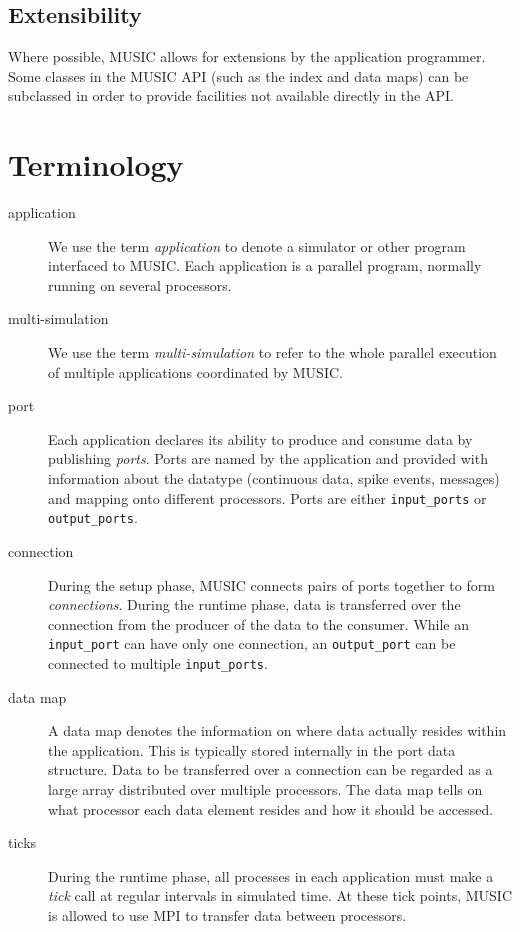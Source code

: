 \documentclass[a4paper,twoside]{report}
\begin{document}
\subsection{Extensibility}

Where possible, MUSIC allows for extensions by the application
programmer.  Some classes in the MUSIC API (such as the index and data
maps) can be subclassed in order to provide facilities not available
directly in the API.


\section{Terminology}

\begin{description}
\item[application] We use the term
  \emph{application} to denote a simulator or other
  program interfaced to MUSIC.  Each application is a parallel
  program, normally running on several processors.

\item[multi-simulation] We use the term
  \emph{multi-simulation} to refer to the
  whole parallel execution of multiple applications coordinated by
  MUSIC.

\item[port] Each application declares its ability to produce and
  consume data by publishing \emph{ports}.  Ports are
  named by the application and provided with information about the
  datatype (continuous data, spike events, messages) and mapping onto
  different processors.  Ports are either
  \lstinline|input_ports| or
  \lstinline|output_ports|.

\item[connection] During the setup phase, MUSIC connects pairs of
  ports together to form \emph{connections}.  During
  the runtime phase, data is transferred over the connection from the
  producer of the data to the consumer.  While an
  \lstinline|input_port| can have only one connection, an
  \lstinline|output_port| can be connected to multiple
  \lstinline|input_ports|.

\item[data map] A data map denotes the information on
  where data actually resides within the application.  This is
  typically stored internally in the port data structure.  Data to be
  transferred over a connection can be regarded as a large array
  distributed over multiple processors. The data map tells on
  what processor each data element resides and how it should be
  accessed.

\item[ticks] During the runtime phase, all processes in each
  application must make a \emph{tick} call at regular
  intervals in simulated time.  At these tick points, MUSIC is allowed
  to use MPI to transfer data between processors.
\end{description}
\end{document}
